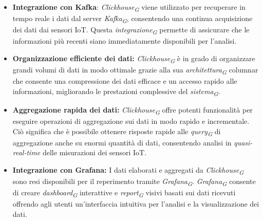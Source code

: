 \begin{itemize}
  \item \textbf{Integrazione con Kafka}: \textit{Clickhouse}\textsubscript{\textit{G}} viene utilizzato per recuperare in tempo reale i dati dal server \textit{Kafka}\textsubscript{\textit{G}}, consentendo una continua acquisizione dei dati dai sensori IoT. Questa \textit{integrazione}\textsubscript{\textit{G}} permette di assicurare che le informazioni più recenti siano immediatamente disponibili per l'analisi.
  
  \item \textbf{Organizzazione efficiente dei dati:} \textit{Clickhouse}\textsubscript{\textit{G}} è in grado di organizzare grandi volumi di dati in modo ottimale grazie alla sua \textit{architettura}\textsubscript{\textit{G}} columnar che consente una compressione dei dati efficace e un accesso rapido alle informazioni, migliorando le prestazioni complessive del \textit{sistema}\textsubscript{\textit{G}}.
  
  \item \textbf{Aggregazione rapida dei dati:} \textit{Clickhouse}\textsubscript{\textit{G}} offre potenti funzionalità per eseguire operazioni di aggregazione sui dati in modo rapido e incrementale. Ciò significa che è possibile ottenere risposte rapide alle \textit{query}\textsubscript{\textit{G}} di aggregazione anche su enormi quantità di dati, consentendo analisi in \textit{quasi-real-time} delle misurazioni dei sensori IoT.
  
  \item \textbf{Integrazione con Grafana:} I dati elaborati e aggregati da \textit{Clickhouse}\textsubscript{\textit{G}} sono resi disponibili per il reperimento tramite \textit{Grafana}\textsubscript{\textit{G}}. \textit{Grafana}\textsubscript{\textit{G}} consente di creare \textit{dashboard}\textsubscript{\textit{G}} interattive e \textit{report}\textsubscript{\textit{G}} visivi basati sui dati ricevuti offrendo agli utenti un'interfaccia intuitiva per l'analisi e la visualizzazione dei dati.
\end{itemize}
